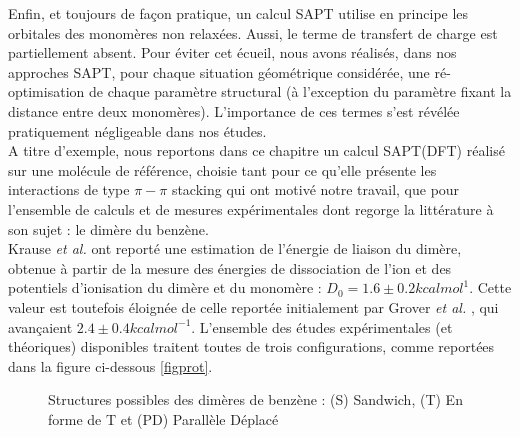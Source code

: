 	
	Enfin, et toujours de façon pratique, un calcul SAPT utilise en principe les orbitales des monomères non relaxées. Aussi, le terme de transfert de charge est partiellement absent. Pour éviter cet écueil, nous avons réalisés, dans nos approches SAPT, pour chaque situation géométrique considérée, une ré-optimisation de chaque paramètre structural (à l'exception du paramètre fixant la distance entre deux monomères). L’importance de ces termes s’est révélée pratiquement négligeable dans nos études.\\
	
	A titre d’exemple, nous reportons dans ce chapitre un calcul SAPT(DFT) réalisé sur une molécule de référence, choisie tant pour ce qu'elle présente les interactions de type $\pi-\pi$ stacking qui ont motivé notre travail, que pour l'ensemble de calculs et de mesures expérimentales dont regorge la littérature à son sujet : le dimère du benzène. \\
	
	Krause \textit{et al.} \cite{krause1991binding} ont reporté une estimation de l’énergie de liaison du dimère, obtenue à partir de la mesure des énergies de dissociation de l'ion et des potentiels d’ionisation du dimère et du monomère : $D_{0}= 1.6 \pm 0.2 kcal mol^{1}$. Cette valeur est toutefois éloignée de celle reportée initialement par Grover \textit{et al.} \cite{grover1987dissociation}, qui avançaient $2.4 \pm 0.4 kcal mol^{-1}$. 
	L’ensemble des études expérimentales (et théoriques) disponibles traitent toutes de trois configurations, comme reportées dans la figure ci-dessous \ref{figprot}.
	
	\begin{figure}[H]
		\centering
		\caption[Structures du dimère de Benzène]{Structures possibles des dimères de benzène : (S) Sandwich, (T) En forme de T et (PD) Parallèle Déplacé}
	\end{figure}
	
